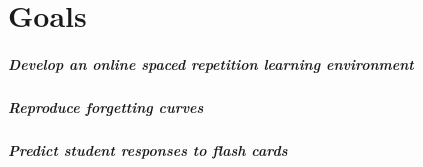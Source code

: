 \chapter{Goals}
\label{goals}
\paragraph{Develop an online spaced repetition learning environment}
\paragraph{Reproduce forgetting curves}
\paragraph{Predict student responses to flash cards}
